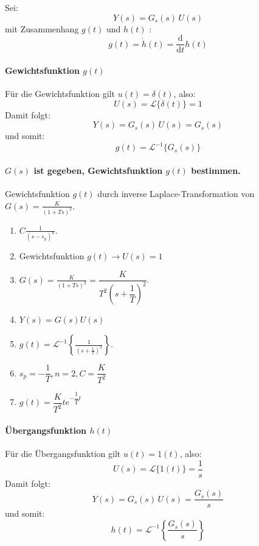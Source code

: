 \documentclass[12pt]{article}
\begin{document}
Sei:
\begin{equation}
	Y(s) = G_s(s)\,U(s)
\end{equation}
mit Zusammenhang \(g(t)\) und \(h(t)\)\footnotemark
{}:
\begin{equation}
	g(t)=\dot{h}(t)=\frac{\mathrm{d}}{\mathrm{d}t}h(t)
\end{equation}

\paragraph{Gewichtsfunktion \(g(t)\)}
Für die Gewichtsfunktion gilt \(u(t)=\delta(t)\), also:
\begin{equation}
	U(s) = \mathcal{L}\{\delta(t)\} = 1
\end{equation}
Damit folgt:
\begin{equation}
	Y(s) = G_s(s)\,U(s) = G_s(s)
\end{equation}
und somit:
\begin{equation}
	g(t) = \mathcal{L}^{-1}\{G_s(s)\}
\end{equation}

\paragraph{ \(G(s)\) ist gegeben, Gewichtsfunktion \(g(t)\) bestimmen.}

Gewichtsfunktion \( g(t) \) durch inverse Laplace-Transformation von \( G(s) = \frac{K}{(1 + Ts)^2} \).

\begin{enumerate}[label=\arabic*.]
	\item \( C\frac{1}{(s - s_p)^n} \).
	\item Gewichtsfunktion \(g(t) \rightarrow U(s) = 1\)
	\item \( G(s) = \frac{K}{(1 + Ts)^2} = \dfrac{K}{T^2 \left( s + \dfrac{1}{T} \right)^2}\).
	\item \(Y(s) = G(s)U(s)\)
	\item \(g(t) = \mathcal{L}^{-1} \left\{ \frac{1}{\left( s + \frac{1}{T} \right)^2} \right\}\).
	\item \(s_p = -\dfrac{1}{T}, n = 2, C = \dfrac{K}{T^2}\)
	\item \(g(t) = \dfrac{K}{T^2} t e^{-\dfrac{1}{T} t}\)
\end{enumerate}


\paragraph{Übergangsfunktion \(h(t)\)}
Für die Übergangsfunktion gilt \(u(t)=1(t)\), also:
\begin{equation}
	U(s) = \mathcal{L}\{1(t)\} = \frac{1}{s}
\end{equation}
Damit folgt:
\begin{equation}
	Y(s) = G_s(s)\,U(s) = \frac{G_s(s)}{s}
\end{equation}
und somit:
\begin{equation}
	h(t) = \mathcal{L}^{-1}\left\{\frac{G_s(s)}{s}\right\}
\end{equation}
\end{document}
